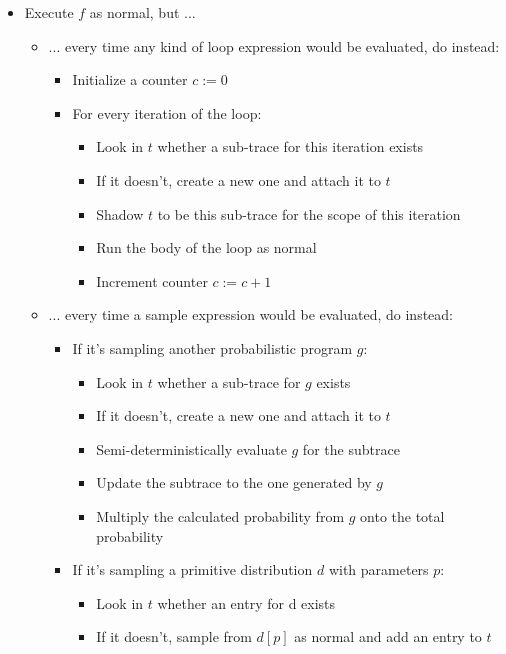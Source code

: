 \begin{minipage}{\linewidth}
\begin{itemize}
\item Execute $f$ as normal, but ...
  \begin{itemize}
  \item ... every time any kind of loop expression would be evaluated, do instead:
    \begin{itemize}
    \item Initialize a counter $c := 0$
    \item For every iteration of the loop:
      \begin{itemize}
      \item Look in $t$ whether a sub-trace for this iteration exists
      \item If it doesn't, create a new one and attach it to $t$
      \item Shadow $t$ to be this sub-trace for the scope of this iteration
      \item Run the body of the loop as normal
      \item Increment counter $c := c + 1$
      \end{itemize}
    \end{itemize}
  \item ... every time a sample expression would be evaluated, do instead:
    \begin{itemize}
    \item If it's sampling another probabilistic program $g$:
      \begin{itemize}
      \item Look in $t$ whether a sub-trace for $g$ exists
      \item If it doesn't, create a new one and attach it to $t$
      \item Semi-deterministically evaluate $g$ for the subtrace
      \item Update the subtrace to the one generated by $g$
      \item Multiply the calculated probability from $g$ onto the total probability
      \end{itemize}
    \item If it's sampling a primitive distribution $d$ with parameters $p$:
      \begin{itemize}
      \item Look in $t$ whether an entry for d exists
      \item If it doesn't, sample from $d[p]$ as normal and add an entry to $t$

\end{itemize}
\end{itemize}
\end{itemize}
\end{itemize}
\end{minipage}
